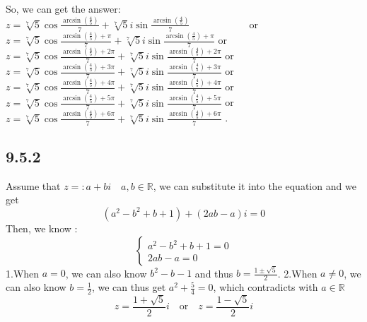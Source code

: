 \documentclass[11pt,twoside,a4paper]{article}
\begin{document}
So, we can get the answer: 
\newline
$\displaystyle z=\sqrt[7]{5}\cos \frac{\arcsin (\frac{4}{5})}{7} +\sqrt[7]{5} i \sin \frac{\arcsin (\frac{4}{5})}{7}\quad\quad\quad\quad\quad\quad$or 
$\displaystyle z=\sqrt[7]{5}\cos \frac{\arcsin (\frac{4}{5})+\pi}{7} +\sqrt[7]{5} i \sin \frac{\arcsin (\frac{4}{5})+\pi}{7}$\newline
or 
$\displaystyle z=\sqrt[7]{5}\cos \frac{\arcsin (\frac{4}{5})+2\pi}{7} +\sqrt[7]{5} i \sin \frac{\arcsin (\frac{4}{5})+2\pi}{7}$
or 
$\displaystyle z=\sqrt[7]{5}\cos \frac{\arcsin (\frac{4}{5})+3\pi}{7} +\sqrt[7]{5} i \sin \frac{\arcsin (\frac{4}{5})+3\pi}{7}$\newline
or 
$\displaystyle z=\sqrt[7]{5}\cos \frac{\arcsin (\frac{4}{5})+4\pi}{7} +\sqrt[7]{5} i \sin \frac{\arcsin (\frac{4}{5})+4\pi}{7}$
or 
$\displaystyle z=\sqrt[7]{5}\cos \frac{\arcsin (\frac{4}{5})+5\pi}{7} +\sqrt[7]{5} i \sin \frac{\arcsin (\frac{4}{5})+5\pi}{7}$\newline
or 
$\displaystyle z=\sqrt[7]{5}\cos \frac{\arcsin (\frac{4}{5})+6\pi}{7} +\sqrt[7]{5} i \sin \frac{\arcsin (\frac{4}{5})+6\pi}{7}$ .
\subsection{9.5.2}
Assume that $z=:a+bi\quad a,b\in \mathbb{R}$, we can substitute it into
the equation and we get 
$$(a^2-b^2+b+1)+(2ab-a)i=0$$
Then, we know :
$$
\begin{cases}
    a^2-b^2+b+1=0\\
    2ab-a=0
\end{cases}
$$
1.When $a=0$, we can also know $b^2-b-1$ and thus $\displaystyle
b=\frac{1\pm \sqrt{5}}{2}$.
\newline
2.When $a\neq 0$, we can also know $\displaystyle b=\frac{1}{2}$, we can thus get
 $\displaystyle a^2+\frac{5}{4}=0$, which contradicts with $a \in \mathbb{R}$
\newline
$$z=\frac{1+\sqrt{5}}{2} i\quad \text{or} \quad z=\frac{1-\sqrt{5}}{2}i$$
\end{document}

